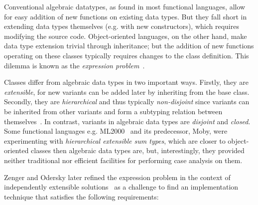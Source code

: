

Conventional algebraic datatypes, as found in most functional languages, allow 
for easy addition of new functions on existing data types. But they fall short 
in extending data types themselves (e.g. with new constructors), which requires 
modifying the source code. Object-oriented languages, on the other hand, make 
data type extension trivial through inheritance; but the addition of new 
functions operating on these classes typically requires changes to the class 
definition. This dilemma is known as the \emph{expression problem}~\cite{Cook90,exprproblem}.

Classes differ from algebraic data types in two important ways. Firstly, they
are \emph{extensible}, for new variants can be added later by inheriting from
the base class. Secondly, they are \emph{hierarchical} and thus typically 
\emph{non-disjoint} since variants can be inherited from other variants and form 
a subtyping relation between themselves~\cite{Glew99}. In contrast, variants in 
algebraic data types are \emph{disjoint} and \emph{closed}.
Some functional languages e.g. ML2000~\cite{ML2000} and its predecessor, Moby, 
were experimenting with \emph{hierarchical extensible sum types}, which are 
closer to object-oriented classes then algebraic data types are, but, 
interestingly, they provided neither traditional nor efficient facilities for 
performing case analysis on them.

Zenger and Odersky later refined the expression problem in the context of 
independently extensible solutions~\cite{fool12} as a challenge to find an 
implementation technique that satisfies the following requirements:

